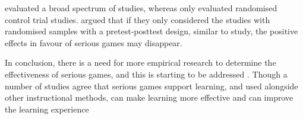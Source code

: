 \documentclass[a4paper,11.5pt]{report}
\numberwithin{figure}{section}
\numberwithin{table}{section}
\numberwithin{equation}{section}
\numberwithin{equation}{section}
\begin{document}
\citeauthor{Pieter2013} evaluated a broad spectrum of studies, whereas \citeauthor{Girard2013} only evaluated randomised control trial studies. \citeauthor{Pieter2013} argued that if they only considered the studies with randomised samples with a pretest-posttest design, similar to \citeauthor{Girard2013} study, the positive effects in favour of serious games may disappear. 

In conclusion, there is a need for more empirical research to determine the effectiveness of serious games, and this is starting to be addressed \citep{Connolly2012}. Though a number of studies agree that serious games support learning, and used alongside other instructional methods, can make learning more effective and can improve the learning experience \citep{Pieter2013, Concannon2005, Granic2014}












\end{document}
